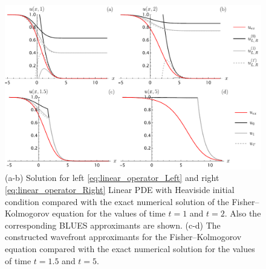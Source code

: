 \documentclass[amsmath,amssymb,amsfonts,aps,pre,preprint,superscriptaddress,bibnotes,showpacs,showkeys,longbibliography]{revtex4-1}
\begin{document}
\begin{figure}[t]
    \centering
    \includegraphics[width=\linewidth]{Figures/PiecewiseApproxGridMixedColumn.pdf}
    \caption{(a-b) Solution for left \eqref{eq:linear_operator_Left} and right \eqref{eq:linear_operator_Right} Linear PDE with Heaviside initial condition compared with the exact numerical solution of the Fisher–Kolmogorov equation for the values of time $t=1$ and $t=2$. Also the corresponding BLUES approximants are shown. (c-d) The constructed wavefront approximants for the Fisher–Kolmogorov equation compared with the exact numerical solution for the values of time $t=1.5$ and $t=5$.}
    \label{fig:GridU1}
\end{figure}

\end{document}
